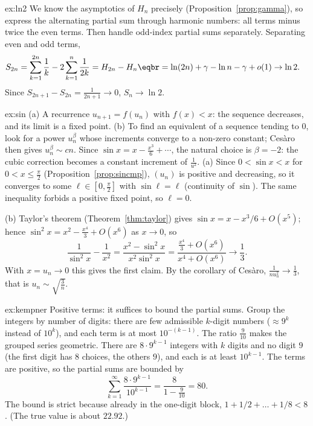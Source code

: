 \begin{solution}{ex:ln2}
\idea We know the asymptotics of $H_n$ precisely (Proposition~\ref{prop:gamma}), so express the alternating partial sum through harmonic numbers: all terms minus twice the even terms. Then handle odd-index partial sums separately.
\writeup Separating even and odd terms,
\[
\begin{aligned}S_{2n}&=\sum_{k=1}^{2n}\frac1k-2\sum_{k=1}^n\frac1{2k}=H_{2n}-H_n\eqbr=\ln(2n)+\gamma-\ln n-\gamma+o(1)\to\ln2.\end{aligned}
\]
Since $S_{2n+1}-S_{2n}=\frac1{2n+1}\to0$, $S_n\to\ln2$.
\end{solution}

\begin{solution}{ex:sin}
\idea (a) A recurrence $u_{n+1}=f(u_n)$ with $f(x)<x$: the sequence decreases, and its limit is a fixed point. (b) To find an equivalent of a sequence tending to $0$, look for a power $u_n^\beta$ whose increments converge to a non-zero constant; Ces\`aro then gives $u_n^\beta\sim cn$. Since $\sin x=x-\frac{x^3}6+\cdots$, the natural choice is $\beta=-2$: the cubic correction becomes a constant increment of $\frac1{u^2}$.
\writeup (a) Since $0<\sin x<x$ for $0<x\le\frac\pi2$ (Proposition~\ref{prop:sincmp}), $(u_n)$ is positive and decreasing, so it converges to some $\ell\in\left[0,\frac\pi2\right]$ with $\sin\ell=\ell$ (continuity of $\sin$). The same inequality forbids a positive fixed point, so $\ell=0$.

(b) Taylor's theorem (Theorem~\ref{thm:taylor}) gives $\sin x=x-x^3/6+O(x^5)$; hence $\sin^2x=x^2-\frac{x^4}3+O(x^6)$ as $x\to0$, so
\[
\frac1{\sin^2x}-\frac1{x^2}=\frac{x^2-\sin^2x}{x^2\sin^2x}=\frac{\frac{x^4}3+O(x^6)}{x^4+O(x^6)}\to\frac13.
\]
With $x=u_n\to0$ this gives the first claim. By the corollary of Ces\`aro, $\frac1{nu_n^2}\to\frac13$, that is $u_n\sim\sqrt{\frac3n}$.
\end{solution}

\begin{solution}{ex:kempner}
\idea Positive terms: it suffices to bound the partial sums. Group the integers by number of digits: there are few admissible $k$-digit numbers ($\approx9^k$ instead of $10^k$), and each term is at most $10^{-(k-1)}$. The ratio $\frac9{10}$ makes the grouped series geometric.
\writeup There are $8\cdot9^{k-1}$ integers with $k$ digits and no digit $9$ (the first digit has $8$ choices, the others $9$), and each is at least $10^{k-1}$.
The terms are positive, so the partial sums are bounded by
\[
\sum_{k=1}^\infty\frac{8\cdot9^{k-1}}{10^{k-1}}=\frac8{1-\frac9{10}}=80.
\]
The bound is strict because already in the one-digit block, $1+1/2+\dots+1/8<8$.
(The true value is about $22.92$.)
\end{solution}

